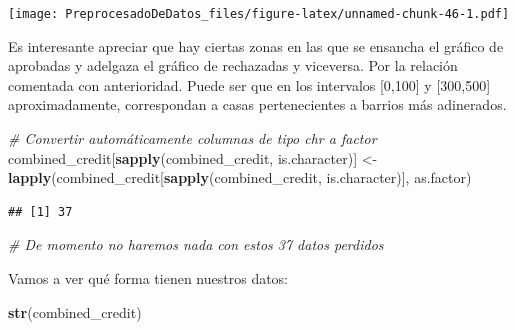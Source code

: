 \documentclass[
]{article}
\newenvironment{Shaded}{\begin{snugshade}}{\end{snugshade}}
\newcommand{\CommentTok}[1]{\textcolor[rgb]{0.56,0.35,0.01}{\textit{#1}}}
\newcommand{\FunctionTok}[1]{\textcolor[rgb]{0.13,0.29,0.53}{\textbf{#1}}}
\newcommand{\NormalTok}[1]{#1}
\newcommand{\OtherTok}[1]{\textcolor[rgb]{0.56,0.35,0.01}{#1}}
\newcommand{\SpecialCharTok}[1]{\textcolor[rgb]{0.81,0.36,0.00}{\textbf{#1}}}
\newcommand{\StringTok}[1]{\textcolor[rgb]{0.31,0.60,0.02}{#1}}
\begin{document}
\texttt{[image: PreprocesadoDeDatos\_files/figure-latex/unnamed-chunk-46-1.pdf]}

Es interesante apreciar que hay ciertas zonas en las que se ensancha el
gráfico de aprobadas y adelgaza el gráfico de rechazadas y viceversa.
Por la relación comentada con anterioridad. Puede ser que en los
intervalos {[}0,100{]} y {[}300,500{]} aproximadamente, correspondan a
casas pertenecientes a barrios más adinerados.

\begin{Shaded}
\begin{Highlighting}[]
\CommentTok{\# Convertir automáticamente columnas de tipo \textquotesingle{}chr\textquotesingle{} a \textquotesingle{}factor\textquotesingle{}}
\NormalTok{combined\_credit[}\FunctionTok{sapply}\NormalTok{(combined\_credit, is.character)] }\OtherTok{\textless{}{-}} \FunctionTok{lapply}\NormalTok{(combined\_credit[}\FunctionTok{sapply}\NormalTok{(combined\_credit, is.character)], as.factor)}
\end{Highlighting}
\end{Shaded}

\begin{Shaded}
\end{Shaded}

\begin{verbatim}
## [1] 37
\end{verbatim}

\begin{Shaded}
\begin{Highlighting}[]
\CommentTok{\# De momento no haremos nada con estos 37 datos perdidos}
\end{Highlighting}
\end{Shaded}

Vamos a ver qué forma tienen nuestros datos:

\begin{Shaded}
\begin{Highlighting}[]
\FunctionTok{str}\NormalTok{(combined\_credit)}
\end{Highlighting}
\end{Shaded}
\end{document}
